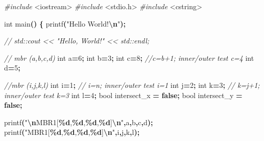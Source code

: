 \documentclass[
]{book}
\newenvironment{Shaded}{\begin{snugshade}}{\end{snugshade}}
\newcommand{\CommentTok}[1]{\textcolor[rgb]{0.56,0.35,0.01}{\textit{#1}}}
\newcommand{\DataTypeTok}[1]{\textcolor[rgb]{0.13,0.29,0.53}{#1}}
\newcommand{\DecValTok}[1]{\textcolor[rgb]{0.00,0.00,0.81}{#1}}
\newcommand{\ImportTok}[1]{#1}
\newcommand{\KeywordTok}[1]{\textcolor[rgb]{0.13,0.29,0.53}{\textbf{#1}}}
\newcommand{\NormalTok}[1]{#1}
\newcommand{\OperatorTok}[1]{\textcolor[rgb]{0.81,0.36,0.00}{\textbf{#1}}}
\newcommand{\PreprocessorTok}[1]{\textcolor[rgb]{0.56,0.35,0.01}{\textit{#1}}}
\newcommand{\SpecialCharTok}[1]{\textcolor[rgb]{0.81,0.36,0.00}{\textbf{#1}}}
\newcommand{\StringTok}[1]{\textcolor[rgb]{0.31,0.60,0.02}{#1}}
\begin{document}
\begin{Shaded}
\begin{Highlighting}[]
\PreprocessorTok{\#include }\ImportTok{\textless{}iostream\textgreater{}}
\PreprocessorTok{\#include }\ImportTok{\textless{}stdio.h\textgreater{}}
\PreprocessorTok{\#include }\ImportTok{\textless{}cstring\textgreater{}}


\DataTypeTok{int}\NormalTok{ main}\OperatorTok{()} \OperatorTok{\{}
\NormalTok{    printf}\OperatorTok{(}\StringTok{"Hello World!}\SpecialCharTok{\textbackslash{}n}\StringTok{"}\OperatorTok{);}

\CommentTok{//    std::cout \textless{}\textless{} "Hello, World!" \textless{}\textless{} std::endl;}

    \CommentTok{// mbr (a,b,c,d)}
    \DataTypeTok{int}\NormalTok{ a}\OperatorTok{=}\DecValTok{6}\OperatorTok{;}
    \DataTypeTok{int}\NormalTok{ b}\OperatorTok{=}\DecValTok{3}\OperatorTok{;}
    \DataTypeTok{int}\NormalTok{ c}\OperatorTok{=}\DecValTok{8}\OperatorTok{;} \CommentTok{//c=b+1; inner/outer test c=4}
    \DataTypeTok{int}\NormalTok{ d}\OperatorTok{=}\DecValTok{5}\OperatorTok{;}

    \CommentTok{//mbr (i,j,k,l)}
    \DataTypeTok{int}\NormalTok{ i}\OperatorTok{=}\DecValTok{1}\OperatorTok{;}    \CommentTok{// i=n;  inner/outer test i=1}
    \DataTypeTok{int}\NormalTok{ j}\OperatorTok{=}\DecValTok{2}\OperatorTok{;}
    \DataTypeTok{int}\NormalTok{ k}\OperatorTok{=}\DecValTok{3}\OperatorTok{;}  \CommentTok{// k=j+1; inner/outer test k=3}
    \DataTypeTok{int}\NormalTok{ l}\OperatorTok{=}\DecValTok{4}\OperatorTok{;}
    \DataTypeTok{bool}\NormalTok{ intersect\_x }\OperatorTok{=} \KeywordTok{false}\OperatorTok{;}
    \DataTypeTok{bool}\NormalTok{ intersect\_y }\OperatorTok{=} \KeywordTok{false}\OperatorTok{;}

\NormalTok{    printf}\OperatorTok{(}\StringTok{"}\SpecialCharTok{\textbackslash{}n}\StringTok{MBR1[}\SpecialCharTok{\%d}\StringTok{,}\SpecialCharTok{\%d}\StringTok{,}\SpecialCharTok{\%d}\StringTok{,}\SpecialCharTok{\%d}\StringTok{]}\SpecialCharTok{\textbackslash{}n}\StringTok{"}\OperatorTok{,}\NormalTok{a}\OperatorTok{,}\NormalTok{b}\OperatorTok{,}\NormalTok{c}\OperatorTok{,}\NormalTok{d}\OperatorTok{);}
\NormalTok{    printf}\OperatorTok{(}\StringTok{"MBR1[}\SpecialCharTok{\%d}\StringTok{,}\SpecialCharTok{\%d}\StringTok{,}\SpecialCharTok{\%d}\StringTok{,}\SpecialCharTok{\%d}\StringTok{]}\SpecialCharTok{\textbackslash{}n}\StringTok{"}\OperatorTok{,}\NormalTok{i}\OperatorTok{,}\NormalTok{j}\OperatorTok{,}\NormalTok{k}\OperatorTok{,}\NormalTok{l}\OperatorTok{);}


\end{Highlighting}
\end{Shaded}
\end{document}
